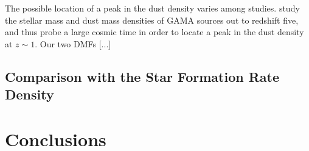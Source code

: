 The possible location of a peak in the dust density varies among studies. \citealt{Driver_2018} study the stellar mass and dust mass densities of GAMA sources out to redshift five, and thus probe a large cosmic time in order to locate a peak in the dust density at $z \sim 1$. Our two DMFs [...]

\subsection{Comparison with the Star Formation Rate Density}

\section{Conclusions}
